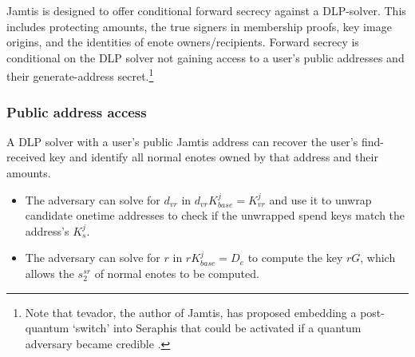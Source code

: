 Jamtis is designed to offer conditional forward secrecy against a DLP-solver. This includes protecting amounts, the true signers in membership proofs, key image origins, and the identities of enote owners/recipients. Forward secrecy is conditional on the DLP solver not gaining access to a user's public addresses and their generate-address secret.\footnote{Note that tevador, the author of Jamtis, has proposed embedding a post-quantum `switch' into Seraphis that could be activated if a quantum adversary became credible \cite{seraphis-post-quantum-switch}.}

\subsubsection{Public address access}
\label{subsubsec:jamtis-forward-secrecy-address-access}

A DLP solver with a user's public Jamtis address can recover the user's find-received key and identify all normal enotes owned by that address and their amounts.
\begin{itemize}
    \item The adversary can solve for $d_{vr}$ in $d_{vr} K^j_{base} = K^j_{vr}$ and use it to unwrap candidate onetime addresses to check if the unwrapped spend keys match the address's $K^j_s$.

    \item The adversary can solve for $r$ in $r K^j_{base} = D_e$ to compute the key $r G$, which allows the $s^{sr}_2$ of normal enotes to be computed.
\end{itemize}

